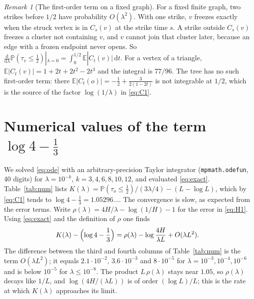 \documentclass[11pt]{amsart}
\theoremstyle{remark}
\newtheorem{remark}[theorem]{Remark}
\numberwithin{equation}{section}
\newcommand{\PP}{\mathbb{P}}
\newcommand{\E}{\mathbb{E}}
\newcommand{\dd}{\mathrm{d}}
\begin{document}
\begin{remark}[The first-order term on a fixed graph]\label{rem:cycles}
For a fixed finite graph, two strikes before $1/2$ have probability
$O(\lambda^2)$. With one strike, $v$ freezes exactly when the struck
vertex is in $C_s(v)$ at the strike time $s$. A strike outside $C_s(v)$
freezes a cluster not containing $v$, and $v$ cannot join that cluster
later, because an edge with a frozen endpoint never opens. So
$\frac{\dd}{\dd\lambda}\PP(\tau_v\le\frac12)|_{\lambda=0}
=\int_0^{1/2}\E|C_t(v)|\,\dd t$. For a vertex of a triangle,
$\E|C_t(v)|=1+2t+2t^2-2t^3$ and the integral is $77/96$. The tree has no
such first-order term: there $\E|C_t(o)|=-\frac12+\frac3{2(1-2t)}$ is not
integrable at $1/2$, which is the source of the factor $\log(1/\lambda)$
in \eqref{eq:C1}.
\end{remark}

\section{Numerical values of the term $\log4-\frac13$}\label{sec:num}

We solved \eqref{eq:ode} with an arbitrary-precision Taylor integrator
(\texttt{mpmath.odefun}, 40 digits) for $\lambda=10^{-k}$,
$k=3,4,6,8,10,12$, and evaluated \eqref{eq:exact}. Table~\ref{tab:num}
lists $K(\lambda)=\PP(\tau_o\le\frac12)/(3\lambda/4)-(L-\log L)$, which
by \eqref{eq:C1} tends to $\log4-\frac13=1.05296\ldots$. The convergence
is slow, as expected from the error terms. Write
$\rho(\lambda)=4H/\lambda-\log(1/H)-1$ for the error in \eqref{eq:H1}. Using
\eqref{eq:exact} and the definition of $\rho$ one finds
\[
K(\lambda)-\Bigl(\log4-\frac13\Bigr)
=\rho(\lambda)-\log\frac{4H}{\lambda L}+O(\lambda L^2).
\]
The difference between the third and fourth columns of Table~\ref{tab:num}
is the term $O(\lambda L^2)$; it equals $2.1\cdot10^{-2}$, $3.6\cdot10^{-3}$
and $8\cdot10^{-5}$ for $\lambda=10^{-3},10^{-4},10^{-6}$ and is below
$10^{-5}$ for $\lambda\le10^{-8}$. The
product $L\,\rho(\lambda)$ stays near $1.05$, so $\rho(\lambda)$ decays like
$1/L$, and $\log(4H/(\lambda L))$ is of order $(\log L)/L$; this is the
rate at which $K(\lambda)$ approaches its limit.
\end{document}
